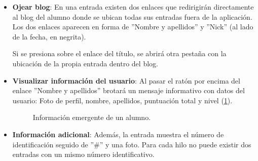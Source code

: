 \documentclass[a4paper, 12pt]{book}
\begin{document}
\begin{itemize}
  Si ese comentario es eliminado, el usuario obtendr\'a una penalizaci\'on de tres \textit{planets}.
  \item {\bfseries Ojear blog}: En una entrada existen dos enlaces que redirigir\'an directamente al blog del alumno donde se ubican todas sus entradas 
  fuera de la aplicaci\'on. Los dos enlaces aparecen en forma de ''Nombre y apellidos'' y ''Nick'' (al lado de la fecha, en negrita).
  
  Si se presiona sobre el enlace del t\'itulo, se abrir\'a otra pesta\~na con la ubicaci\'on de la propia entrada dentro del blog.
  \item {\bfseries Visualizar informaci\'on del usuario}: Al pasar el rat\'on por encima del enlace ''Nombre y apellidos'' brotar\'a un mensaje informativo 
  con datos del usuario: Foto de perfil, nombre, apellidos, puntuaci\'on total y nivel (\ref{figura:hiloalumno2}).
  \begin{figure}[htbp] 
    \centering
    \caption{Informaci\'on emergente de un alumno.}
    \label{figura:hiloalumno2}
  \end{figure}
  
  \item {\bfseries Informaci\'on adicional}: Adem\'as, la entrada muestra el n\'umero de identificaci\'on seguido de ''\#'' y una foto. Para cada hilo no puede existir
  dos entradas con un mismo n\'umero identificativo.
\end{itemize}
\end{document}
